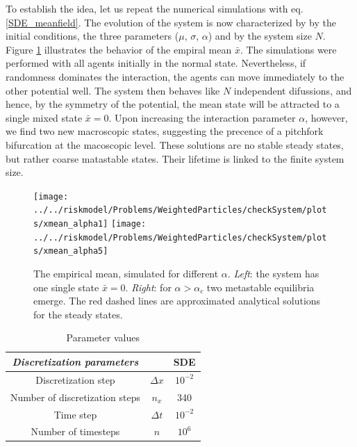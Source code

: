 \documentclass[]{article}
\theoremstyle{definition}
\begin{document}
To establish the idea, let us repeat the numerical simulations with eq. \ref{SDE_meanfield}. The evolution of the system is now characterized by  by the initial conditions, the three parameters ($\mu$, $\sigma$, $\alpha$) and by the system size $N$. Figure \ref{fig:sysrisk}  illustrates the behavior of the empiral mean $\bar{x}$. The simulations were performed with all agents initially in the normal state. Nevertheless, if randomness dominates the interaction, the agents can move immediately to the other potential well. The system then behaves like $N$ independent difussions, and hence, by the symmetry of the potential, the mean state will be attracted to a single mixed state $\bar{x}=0$. Upon increasing the interaction parameter $\alpha$, however, we find two new macroscopic states, suggesting the precence of a pitchfork bifurcation at the macoscopic level. These solutions are no stable steady states, but rather coarse matastable states. Their lifetime is linked to the finite system size. 



\begin{center}
\begin{figure}
\texttt{[image: ../../riskmodel/Problems/WeightedParticles/checkSystem/plots/xmean\_alpha1]}
\texttt{[image: ../../riskmodel/Problems/WeightedParticles/checkSystem/plots/xmean\_alpha5]}

\caption{The empirical mean, simulated for different $\alpha$. \textit{Left}: the system has one single state $\bar{x}=0$. \textit{Right}: for $\alpha> \alpha_c$ two metastable equilibria emerge. 
 The red dashed lines are approximated  analytical solutions for the steady states. \label{fig:sysrisk}}
\end{figure}
\end{center}


 \begin{center}
\begin{table}
\caption{Parameter values}
  \begin{tabular} { | c  c | c |}    \hline   
   \textit{ {Discretization parameters}}&    &  SDE    \\ \hline
    Discretization step  & $\Delta x $  & $10^{-2}$ \\ 
        Number of discretization steps  & $n_x$ &  340 \\ 
    Time step  &  $\Delta t$ &   $10^{-2}$ \\ 
       Number of timesteps  & $n$  &  $10^{6}$ \\ \hline
  \end{tabular}
\end{table}
\end{center}
\end{document}
